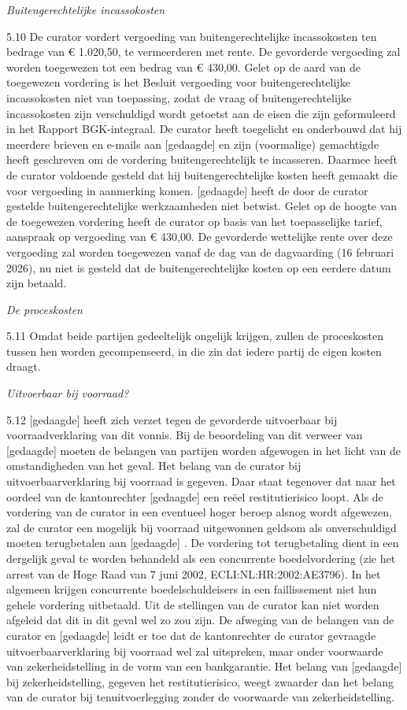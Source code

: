 \documentclass[
  dutch,
  a4paper,
]{article}
\begin{document}
\emph{Buitengerechtelijke incassokosten}

5.10 De curator vordert vergoeding van buitengerechtelijke incassokosten ten bedrage van € 1.020,50, te vermeerderen met rente. De gevorderde vergoeding zal worden toegewezen tot een bedrag van € 430,00. Gelet op de aard van de toegewezen vordering is het Besluit vergoeding voor buitengerechtelijke incassokosten niet van toepassing, zodat de vraag of buitengerechtelijke incassokosten zijn verschuldigd wordt getoetst aan de eisen die zijn geformuleerd in het Rapport BGK-integraal. De curator heeft toegelicht en onderbouwd dat hij meerdere brieven en e-mails aan {[}gedaagde{]} en zijn (voormalige) gemachtigde heeft geschreven om de vordering buitengerechtelijk te incasseren. Daarmee heeft de curator voldoende gesteld dat hij buitengerechtelijke kosten heeft gemaakt die voor vergoeding in aanmerking komen. {[}gedaagde{]} heeft de door de curator gestelde buitengerechtelijke werkzaamheden niet betwist. Gelet op de hoogte van de toegewezen vordering heeft de curator op basis van het toepasselijke tarief, aanspraak op vergoeding van € 430,00. De gevorderde wettelijke rente over deze vergoeding zal worden toegewezen vanaf de dag van de dagvaarding (16 februari 2026), nu niet is gesteld dat de buitengerechtelijke kosten op een eerdere datum zijn betaald.

\emph{De proceskosten}

5.11 Omdat beide partijen gedeeltelijk ongelijk krijgen, zullen de proceskosten tussen hen worden gecompenseerd, in die zin dat iedere partij de eigen kosten draagt.

\emph{Uitvoerbaar bij voorraad?}

5.12 {[}gedaagde{]} heeft zich verzet tegen de gevorderde uitvoerbaar bij voorraadverklaring van dit vonnis. Bij de beoordeling van dit verweer van {[}gedaagde{]} moeten de belangen van partijen worden afgewogen in het licht van de omstandigheden van het geval. Het belang van de curator bij uitvoerbaarverklaring bij voorraad is gegeven. Daar staat tegenover dat naar het oordeel van de kantonrechter {[}gedaagde{]} een reëel restitutierisico loopt. Als de vordering van de curator in een eventueel hoger beroep alsnog wordt afgewezen, zal de curator een mogelijk bij voorraad uitgewonnen geldsom als onverschuldigd moeten terugbetalen aan {[}gedaagde{]} . De vordering tot terugbetaling dient in een dergelijk geval te worden behandeld als een concurrente boedelvordering (zie het arrest van de Hoge Raad van 7 juni 2002, ECLI:NL:HR:2002:AE3796). In het algemeen krijgen concurrente boedelschuldeisers in een faillissement niet hun gehele vordering uitbetaald. Uit de stellingen van de curator kan niet worden afgeleid dat dit in dit geval wel zo zou zijn. De afweging van de belangen van de curator en {[}gedaagde{]} leidt er toe dat de kantonrechter de curator gevraagde uitvoerbaarverklaring bij voorraad wel zal uitspreken, maar onder voorwaarde van zekerheidstelling in de vorm van een bankgarantie. Het belang van {[}gedaagde{]} bij zekerheidstelling, gegeven het restitutierisico, weegt zwaarder dan het belang van de curator bij tenuitvoerlegging zonder de voorwaarde van zekerheidstelling.
\end{document}
